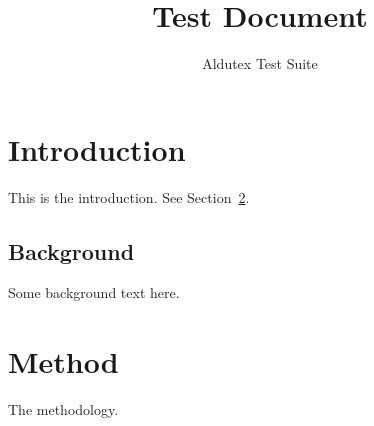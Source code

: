 \documentclass{article}
\title{Test Document}
\author{Aldutex Test Suite}
\begin{document}
\maketitle
\section{Introduction}\label{sec:intro}
This is the introduction. See Section~\ref{sec:method}.
\subsection{Background}
Some background text here.
\section{Method}\label{sec:method}
The methodology.
\end{document}
